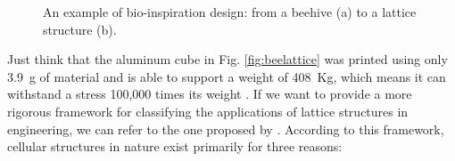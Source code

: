 \begin{figure}
    \centering
    \quad
    \caption[Bio-inspiration design.]{An example of bio-inspiration design: from a beehive (a) to a lattice structure (b).}
    \label{fig:bioinsp}
\end{figure}
Just think that the aluminum cube in Fig. \ref{fig:beelattice} was printed using only \SI{3.9}{g} of material and is able to support a weight of \SI{408}{Kg}, which means it can withstand a stress 100,000 times its weight \cite{noauthor_3d_2014}. If we want to provide a more rigorous framework for classifying the applications of lattice structures in engineering, we can refer to the one proposed by \citeauthor{mcnulty_framework_2017}. According to this framework, cellular structures in nature exist primarily for three reasons:
